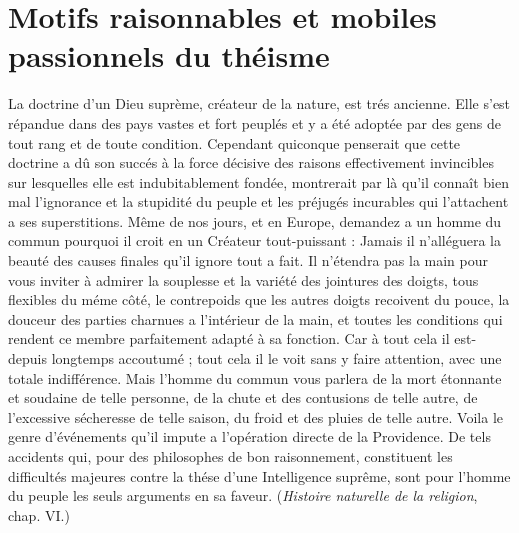 
\section{Motifs raisonnables et mobiles passionnels du théisme}

La doctrine d’un Dieu suprème, créateur de la nature,
est trés ancienne. Elle s’est répandue dans des pays vastes
et fort peuplés et y a été adoptée par des gens de tout
rang et de toute condition. Cependant quiconque penserait
que cette doctrine a dû son succés à la force décisive des
raisons effectivement invincibles sur lesquelles elle est
indubitablement fondée, montrerait par là qu’il connaît
bien mal l'ignorance et la stupidité du peuple et les
préjugés incurables qui l’attachent a ses superstitions.
Même de nos jours, et en Europe, demandez a un homme
du commun pourquoi il croit en un Créateur tout-puissant :
Jamais il n’alléguera la beauté des causes finales qu’il
ignore tout a fait. Il n’étendra pas la main pour vous
inviter à admirer la souplesse et la variété des jointures
des doigts, tous flexibles du méme côté, le contrepoids
que les autres doigts recoivent du pouce, la douceur des
parties charnues a l’intérieur de la main, et toutes les
conditions qui rendent ce membre parfaitement adapté
à sa fonction. Car à tout cela il est-depuis longtemps
accoutumé ; tout cela il le voit sans y faire attention,
avec une totale indifférence. Mais l'homme du commun
vous parlera de la mort étonnante et soudaine de telle
personne, de la chute et des contusions de telle autre, de
l'excessive sécheresse de telle saison, du froid et des pluies
de telle autre. Voila le genre d’événements qu’il impute a
l'opération directe de la Providence. De tels accidents qui,
pour des philosophes de bon raisonnement, constituent
les difficultés majeures contre la thése d’une Intelligence
suprême, sont pour l’homme du peuple les seuls arguments
en sa faveur. ({\it Histoire naturelle de la religion}, chap. VI.)

